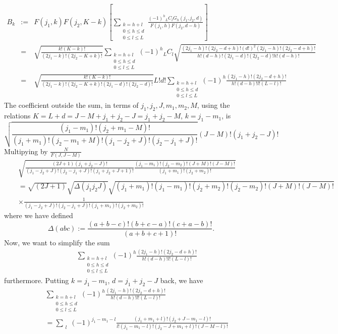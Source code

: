 \documentclass{article}
\begin{document}
\begin{eqnarray}
B_k & := & F(j_1,k)F(j_2,K-k) \left[ \sum_{\substack{k=h+l\\0\le h \le d\\0\le l \le L}} \frac{ (-1)^h {}_LC_{l}G_h(j_1,j_2,d) }{F(j_1,h)F(j_2,d-h)}\right] \nonumber\\
 & = & \sqrt{\frac{k!(K-k)!}{(2j_1 -k)!(2j_2-K+k)!}}  \sum_{\substack{k=h+l\\0\le h \le d\\0\le l \le L}}  (-1)^h {}_LC_{l}\sqrt{\frac{(2j_1-h)!(2j_2-d+h)!(d!)^2(2j_1-h)!(2j_2-d+h)!}{h!(d-h)!(2j_1-d)!(2j_2-d)!h!(d-h)!}}  \nonumber \\
 &=& \sqrt{\frac{k!(K-k)!}{(2j_1 -k)!(2j_2-K+k)!(2j_1-d)!(2j_2-d)!}} L!d!\sum_{\substack{k=h+l\\0\le h \le d\\0\le l \le L}}  (-1)^h \frac{(2j_1-h)!(2j_2-d+h)!}{h!(d-h)!l!(L-l)!} \nonumber 
\end{eqnarray}
The coefficient outside the sum, in terms of $j_1,j_2,J,m_1,m_2,M$, using the relations $K=L+d = J- M + j_1 + j_2 -J = j_1 +j_2 -M$, $k=j_1-m_1$, is
\begin{equation}
\label{ }
\sqrt{\frac{(j_1-m_1)!(j_2+m_1 -M)!}{(j_1 + m_1)!(j_2-m_1 +M )!(j_1-j_2 +J)!(j_2-j_1 +J)!}} (J-M)!(j_1+j_2-J)!
\end{equation}
Multipying by $\frac{N}{F(J,J-M)}$
\begin{eqnarray}
&&\sqrt{\frac{(2J+1)(j_1+j_2 -J)!}{(j_1-j_2 +J)!(j_2-j_1 +J)!(j_1+j_2+J+1)!}\frac{(j_1-m_1)!(j_2-m_2)!(J+M)!(J-M)!}{(j_1 + m_1)!(j_2+m_2 )!}} \nonumber\\
&& = \sqrt{(2J+1)}\sqrt{\Delta(j_1j_2J)}\sqrt{(j_1 + m_1)!(j_1-m_1)!(j_2+m_2 )!(j_2-m_2)!(J+M)!(J-M)!} \nonumber\\
&&\times\frac{1}{(j_1-j_2 +J)!(j_2-j_1 +J)!(j_1 + m_1)!(j_2+m_2 )!}
\end{eqnarray}
where we have defined
\begin{equation}
\label{ }
\Delta(abc) := \frac{(a+b-c)!(b+c-a)!(c+a-b)!}{(a+b+c+1)!}.
\end{equation}
Now, we want to simplify the sum
\begin{eqnarray}
&&\sum_{\substack{k=h+l\\0\le h \le d\\0\le l \le L}}  (-1)^h \frac{(2j_1-h)!(2j_2-d+h)!}{h!(d-h)!l!(L-l)!}
\end{eqnarray}
furthermore. Putting $k = j_1- m_1$, $d= j_1 + j_2 -J$ back, we have
\begin{eqnarray}
&&\sum_{\substack{k=h+l\\0\le h \le d\\0\le l \le L}}  (-1)^h \frac{(2j_1-h)!(2j_2-d+h)!}{h!(d-h)!l!(L-l)!} \nonumber\\ 
&&=\sum_{\substack{l}} (-1)^{j_1 -m_1 -l} \frac{(j_1+m_1+l)!(j_2+J-m_1-l)!}{l!(j_1-m_1-l)!(j_2-J+m_1+l)!(J-M-l)!} \nonumber
\end{eqnarray}
\end{document}
